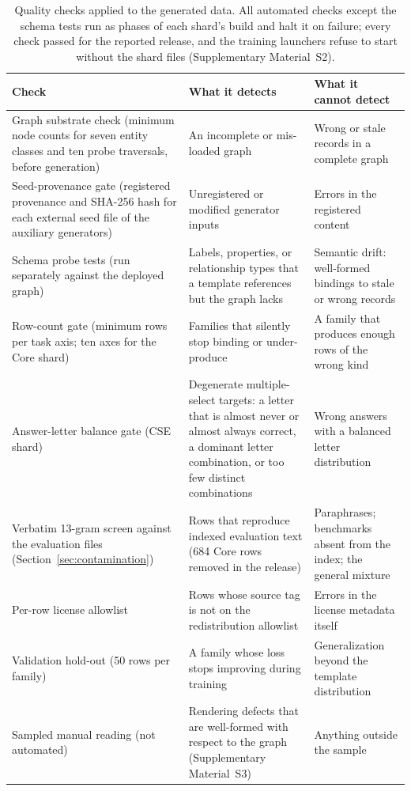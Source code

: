 \documentclass[a4paper,fleqn]{cas-dc}
\begin{document}
\begin{table}
\centering\footnotesize
\caption{Quality checks applied to the generated data. All automated checks except the schema tests run as phases of each shard's build and halt it on failure; every check passed for the reported release, and the training launchers refuse to start without the shard files (Supplementary Material~S2).}\label{tab:gates}
\begin{tabularx}{\textwidth}{@{}P{4.2cm}XX@{}}
\toprule Check & What it detects & What it cannot detect \\\midrule
Graph substrate check (minimum node counts for seven entity classes and ten probe traversals, before generation) & An incomplete or mis-loaded graph & Wrong or stale records in a complete graph \\
Seed-provenance gate (registered provenance and SHA-256 hash for each external seed file of the auxiliary generators) & Unregistered or modified generator inputs & Errors in the registered content \\
Schema probe tests (run separately against the deployed graph) & Labels, properties, or relationship types that a template references but the graph lacks & Semantic drift: well-formed bindings to stale or wrong records \\
Row-count gate (minimum rows per task axis; ten axes for the Core shard) & Families that silently stop binding or under-produce & A family that produces enough rows of the wrong kind \\
Answer-letter balance gate (CSE shard) & Degenerate multiple-select targets: a letter that is almost never or almost always correct, a dominant letter combination, or too few distinct combinations & Wrong answers with a balanced letter distribution \\
Verbatim 13-gram screen against the evaluation files (Section~\ref{sec:contamination}) & Rows that reproduce indexed evaluation text (684 Core rows removed in the release) & Paraphrases; benchmarks absent from the index; the general mixture \\
Per-row license allowlist & Rows whose source tag is not on the redistribution allowlist & Errors in the license metadata itself \\
Validation hold-out (50 rows per family) & A family whose loss stops improving during training & Generalization beyond the template distribution \\
Sampled manual reading (not automated) & Rendering defects that are well-formed with respect to the graph (Supplementary Material~S3) & Anything outside the sample \\\bottomrule
\end{tabularx}
\end{table}
\end{document}
